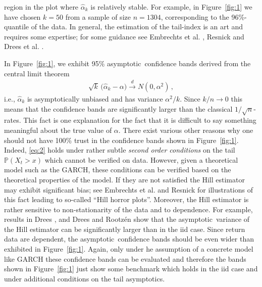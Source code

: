 \documentclass[11pt,a4]{amsart}
\newcommand{\clt}{central limit theorem}
\newcommand{\asy}{asymptotic}
\newcommand{\beam}{\begin{eqnarray}}
\newcommand{\eeam}{\end{eqnarray}\noindent}
\newcommand{\std}{\stackrel{d}{\rightarrow}}
\renewcommand{\P }{{\mathbb P}}
\newcommand{\1}{{\mathbf 1}}
\begin{document}
region in the plot where $\hat \alpha_k$ is relatively
stable. For example, in Figure~\ref{fig:1} we have chosen $k=50$ from
a sample of size $n=1304$, corresponding to the 96\%-quantile of the
data. In general, the estimation of the tail-index is an art and
requires some expertise; for some guidance
see Embrechts et al. \cite{embrechts:klueppelberg:mikosch:1997},
Resnick \cite{resnick:2007} and Drees et al. 
\cite{drees:resnick:2000}. 
\par
In Figure~\ref{fig:1},
we exhibit 95\% \asy\ confidence bands derived from  the \clt
\beam\label{eq:2}
\sqrt k\, \big(\hat \alpha_k - \alpha\big) \std N(0, \alpha^2)\,,
\eeam
i.e., $\hat \alpha_k$ is \asy ally unbiased and has variance
$\alpha^2/k$. Since $k/n\to 0$ this means that the 
confidence bands are significantly larger than the classical
$1/\sqrt{n}$-rates. This fact is one explanation for the fact that it is
difficult to say something meaningful about the true value of
$\alpha$. There exist various other reasons why one should
not have 100\% trust in the confidence bands shown in
Figure~\ref{fig:1}. Indeed, \eqref{eq:2}
holds under rather subtle {\em second order conditions} on the tail
$\P(X_t>x)$ which cannot be verified on data. However, 
given a theoretical model such as the GARCH, these conditions can be
verified based on the theoretical properties of the model. If they are not satisfied the 
Hill estimator may exhibit significant bias; see Embrechts et
al. \cite{embrechts:klueppelberg:mikosch:1997} and Resnick \cite{resnick:1987} for illustrations 
of this fact leading to so-called ``Hill horror plots''. Moreover, the
Hill estimator is rather sensitive to non-stationarity 
of the data and to dependence. For example, results in Drees \cite{drees:2008}, and Drees and
Rootz\'en \cite{drees:rootzen:2010} show that the \asy\ variance of the
Hill estimator can be significantly larger than in the iid case. 
Since return data are dependent, the \asy\ confidence bands should be
even wider than exhibited in Figure~\ref{fig:1}. 
Again, only under he assumption of a concrete model like GARCH these
confidence bands can be evaluated and therefore the bands shown in Figure~\ref{fig:1}
just show some benchmark which holds in the iid case and under additional conditions on the tail \asy s.
\end{document}
